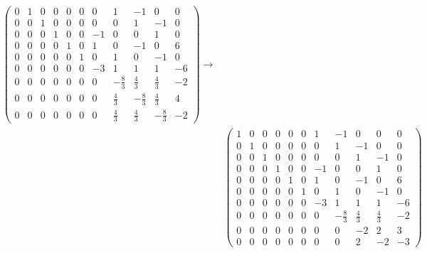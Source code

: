 ﻿\documentclass{book} \usepackage{exsheets} \usepackage{xeCJK}
\begin{document}
\begin{solution}
\begin{align*}
\begin{pmatrix}
                                              0&1&0&0&0&0&0&1&-1&0&0\\
                                              0&0&1&0&0&0&0&0&1&-1&0\\
                                              0&0&0&1&0&0&-1&0&0&1&0\\
                                              0&0&0&0&1&0&1&0&-1&0&6\\
                                              0&0&0&0&0&1&0&1&0&-1&0\\
                                              0&0&0&0&0&0&-3&1&1&1&-6\\
                                              0&0&0&0&0&0&0&-\frac{8}{3}&\frac{4}{3}&\frac{4}{3}&-2\\
                                              0&0&0&0&0&0&0&\frac{4}{3}&-\frac{8}{3}&\frac{4}{3}&4\\
                                              0&0&0&0&0&0&0&\frac{4}{3}&\frac{4}{3}&-\frac{8}{3}&-2
                                            \end{pmatrix}\to\\&
                                                                \begin{pmatrix}
                                                                  1&0&0&0&0&0&1&-1&0&0&0\\
                                                                  0&1&0&0&0&0&0&1&-1&0&0\\
                                                                  0&0&1&0&0&0&0&0&1&-1&0\\
                                                                  0&0&0&1&0&0&-1&0&0&1&0\\
                                                                  0&0&0&0&1&0&1&0&-1&0&6\\
                                                                  0&0&0&0&0&1&0&1&0&-1&0\\
                                                                  0&0&0&0&0&0&-3&1&1&1&-6\\
                                                                  0&0&0&0&0&0&0&-\frac{8}{3}&\frac{4}{3}&\frac{4}{3}&-2\\
                                                                  0&0&0&0&0&0&0&0&-2&2&3\\
                                                                  0&0&0&0&0&0&0&0&2&-2&-3

\end{pmatrix}
\end{align*}
\end{solution}
\end{document}
